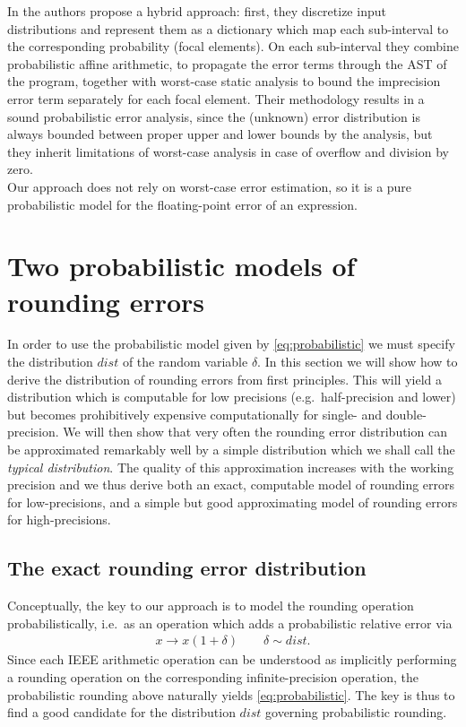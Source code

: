 \documentclass[10pt,conference]{IEEEtran}
\newcommand{\ie}{i.e.\ }
\newcommand{\eg}{e.g.\ }
\begin{document}
In \cite{probdaisy} the authors propose a hybrid approach: first, they
discretize input distributions and represent them as a dictionary which map each sub-interval to the corresponding probability (focal elements). On each sub-interval they combine probabilistic affine arithmetic, to propagate the error terms through the AST of the program, together with worst-case static analysis to bound the imprecision error term separately for each focal element. Their methodology results in a sound probabilistic error analysis, since the (unknown) error distribution is always bounded between proper upper and lower bounds by the analysis, but they inherit limitations of worst-case analysis in case of overflow and division by zero.\\
Our approach does not rely on worst-case error estimation, so it is a pure probabilistic model for the floating-point error of an expression.

\section{Two probabilistic models of rounding errors}\label{sec:rounding}

In order to use the probabilistic model given by \cref{eq:probabilistic} we must specify the distribution $dist$ of the random variable $\delta$. In this section we will show how to derive the distribution of rounding errors from first principles. This will yield a distribution which is computable for low precisions (\eg half-precision and lower) but becomes prohibitively expensive computationally for single- and double-precision. We will then show that very often the rounding error distribution can be approximated remarkably well by a simple distribution which we shall call the \emph{typical distribution}. The quality of this approximation increases with the working precision and we thus derive both an exact, computable model of rounding errors for low-precisions, and a simple but good approximating model of rounding errors for high-precisions.

\subsection{The exact rounding error distribution}\label{subsec:error_dist}

Conceptually, the key to our approach is to model the rounding operation probabilistically, \ie as an operation which adds a probabilistic relative error via
\begin{align}
x \longrightarrow x(1+\delta)\qquad \delta\sim dist.\label{eq:rounding}
\end{align}
Since each IEEE arithmetic operation can be understood as implicitly performing a rounding operation on the corresponding infinite-precision operation, the probabilistic rounding above naturally yields \cref{eq:probabilistic}. The key is thus to find a good candidate for the distribution $dist$ governing probabilistic rounding.
\end{document}

